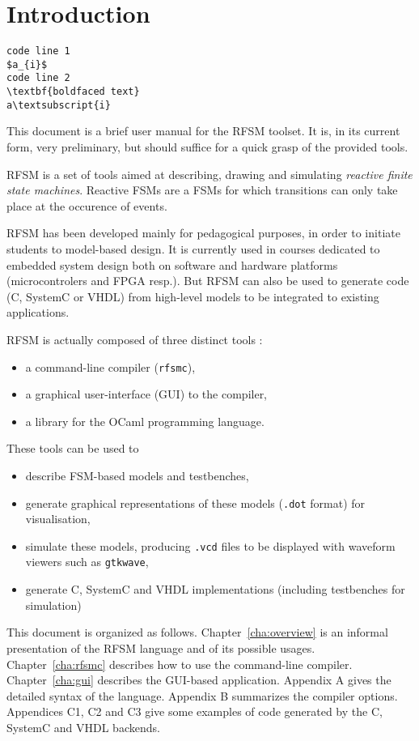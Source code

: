 \chapter{Introduction}
\label{chap:intro}

\begin{Verbatim}[commandchars=\\\{\},codes={\catcode`$=3\catcode`_=8}]
code line 1
$a_{i}$
code line 2
\textbf{boldfaced text}
a\textsubscript{i}
\end{Verbatim}

This document is a brief user manual for the RFSM toolset. It is, in its current form, very
preliminary, but should suffice for a quick grasp of the provided tools. 

\medskip
RFSM is a set of tools aimed at describing, drawing and simulating \emph{reactive finite state
  machines}. Reactive FSMs are a FSMs for which transitions can only take place at the occurence of
events.

\medskip
RFSM has been developed mainly for pedagogical purposes, in order to initiate students to
model-based design. It is currently used in courses dedicated to embedded system design both on
software and hardware platforms (microcontrolers and FPGA resp.). But RFSM can also be used to
generate code (C, SystemC or VHDL) from high-level models to be integrated to existing applications.

\medskip
RFSM is actually composed of three distinct tools :
\begin{itemize}
\item a command-line compiler (\texttt{rfsmc}),
\item a graphical user-interface (GUI) to the compiler, 
\item a library for the OCaml programming language.
\end{itemize}

These tools can be used to
\begin{itemize}
\item describe FSM-based models and testbenches,
\item generate graphical representations of these models (\verb|.dot| format) for visualisation,
\item simulate these models, producing \verb|.vcd| files to be displayed with waveform viewers such
  as \texttt{gtkwave},
\item generate C, SystemC and VHDL implementations (including testbenches for simulation)
\end{itemize}

\medskip
This document is organized as follows.
Chapter~\ref{cha:overview} is an informal presentation of the RFSM language and of its
possible usages. Chapter~\ref{cha:rfsmc} describes how to use the command-line
compiler. Chapter~\ref{cha:gui} describes the GUI-based application. Appendix A 
gives the detailed syntax of the language. Appendix B summarizes the compiler options. Appendices
C1, C2 and C3 give some examples of code generated by the C, SystemC and VHDL backends.

